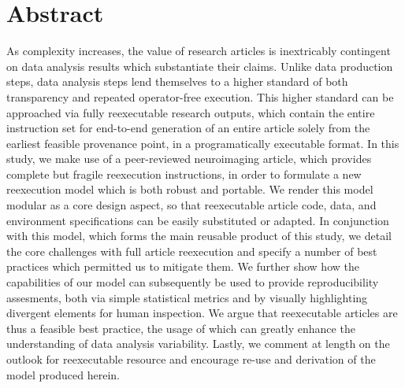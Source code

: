 \section{Abstract}

As complexity increases, the value of research articles is inextricably contingent on data analysis results which substantiate their claims.
Unlike data production steps, data analysis steps lend themselves to a higher standard of both transparency and repeated operator-free execution.
This higher standard can be approached via fully reexecutable research outputs, which contain the entire instruction set for end-to-end generation of an entire article solely from the earliest feasible provenance point, in a programatically executable format.
In this study, we make use of a peer-reviewed neuroimaging article, which provides complete but fragile reexecution instructions, in order to formulate a new reexecution model which is both robust and portable.
We render this model modular as a core design aspect, so that reexecutable article code, data, and environment specifications can be easily substituted or adapted.
In conjunction with this model, which forms the main reusable product of this study, we detail the core challenges with full article reexecution and specify a number of best practices which permitted us to mitigate them.
We further show how the capabilities of our model can subsequently be used to provide reproducibility assesments, both via simple statistical metrics and by visually highlighting divergent elements for human inspection.
We argue that reexecutable articles are thus a feasible best practice, the usage of which can greatly enhance the understanding of data analysis variability.
Lastly, we comment at length on the outlook for reexecutable resource and encourage re-use and derivation of the model produced herein.


